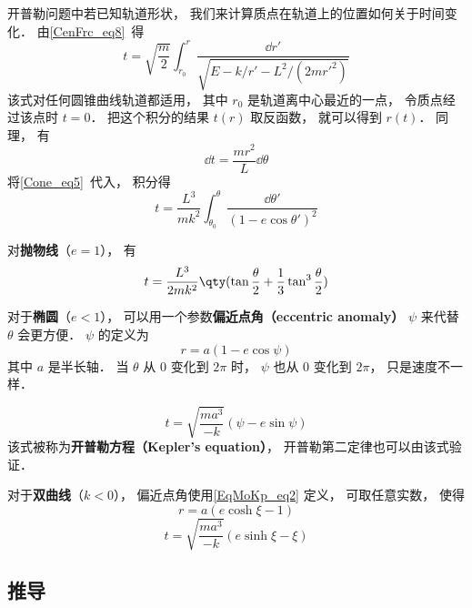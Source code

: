 

开普勒问题中若已知轨道形状， 我们来计算质点在轨道上的位置如何关于时间变化． 由\autoref{CenFrc_eq8}~得
\begin{equation}
t = \sqrt{\frac{m}{2}} \int_{r_0}^r \frac{\dd{r'}}{\sqrt{E - k/r' - L^2/(2mr'^2)}}
\end{equation}
该式对任何圆锥曲线轨道都适用， 其中 $r_0$ 是轨道离中心最近的一点， 令质点经过该点时 $t= 0$． 把这个积分的结果 $t(r)$ 取反函数， 就可以得到 $r(t)$． 同理， 有
\begin{equation}
\dd{t} = \frac{mr^2}{L}\dd{\theta}
\end{equation}
将\autoref{Cone_eq5}~代入， 积分得
\begin{equation}
t = \frac{L^3}{mk^2} \int_{\theta_0}^\theta \frac{\dd{\theta'}}{(1 - e\cos \theta')^2 }
\end{equation}

对\textbf{抛物线}（$e = 1$）， 有
\begin{equation}\label{EqMoKp_eq3}
t = \frac{L^3}{2mk^2} \qty(\tan\frac{\theta}{2} +  \frac{1}{3}\tan^3 \frac{\theta}{2})
\end{equation}

对于\textbf{椭圆}（$e < 1$）， 可以用一个参数\textbf{偏近点角（eccentric anomaly）} $\psi$ 来代替 $\theta$ 会更方便． $\psi$ 的定义为
\begin{equation}\label{EqMoKp_eq1}
r = a(1-e\cos\psi)
\end{equation}
其中 $a$ 是半长轴． 当 $\theta$ 从 $0$ 变化到 $2\pi$ 时， $\psi$ 也从 $0$ 变化到 $2\pi$， 只是速度不一样．

\begin{equation}
t = \sqrt{\frac{ma^3}{-k}} (\psi - e \sin\psi)
\end{equation}
该式被称为\textbf{开普勒方程（Kepler's equation）}， 开普勒第二定律也可以由该式验证．

对于\textbf{双曲线}（$k<0$）， 偏近点角使用\autoref{EqMoKp_eq2} 定义， 可取任意实数， 使得
\begin{equation}\label{EqMoKp_eq2} %
r = a(e\cosh\xi - 1)
\end{equation}
\begin{equation}\label{EqMoKp_eq4}
t = \sqrt{\frac{ma^3}{-k}} (e\sinh\xi - \xi)
\end{equation}



\subsection{推导}
